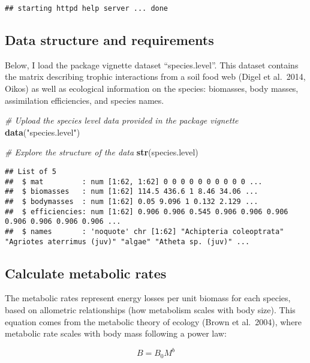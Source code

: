 \documentclass[
]{article}
\newenvironment{Shaded}{\begin{snugshade}}{\end{snugshade}}
\newcommand{\CommentTok}[1]{\textcolor[rgb]{0.56,0.35,0.01}{\textit{#1}}}
\newcommand{\FunctionTok}[1]{\textcolor[rgb]{0.13,0.29,0.53}{\textbf{#1}}}
\newcommand{\NormalTok}[1]{#1}
\newcommand{\StringTok}[1]{\textcolor[rgb]{0.31,0.60,0.02}{#1}}
\begin{document}
\begin{verbatim}
## starting httpd help server ... done
\end{verbatim}

\subsection{Data structure and
requirements}\label{data-structure-and-requirements}

Below, I load the package vignette dataset ``species.level''. This
dataset contains the matrix describing trophic interactions from a soil
food web (Digel et al.~2014, Oikos) as well as ecological information on
the species: biomasses, body masses, assimilation efficiencies, and
species names.

\begin{Shaded}
\begin{Highlighting}[]
\CommentTok{\# Upload the species level data provided in the package vignette}
\FunctionTok{data}\NormalTok{(}\StringTok{"species.level"}\NormalTok{)}

\CommentTok{\# Explore the structure of the data}
\FunctionTok{str}\NormalTok{(species.level)}
\end{Highlighting}
\end{Shaded}

\begin{verbatim}
## List of 5
##  $ mat         : num [1:62, 1:62] 0 0 0 0 0 0 0 0 0 0 ...
##  $ biomasses   : num [1:62] 114.5 436.6 1 8.46 34.06 ...
##  $ bodymasses  : num [1:62] 0.05 9.096 1 0.132 2.129 ...
##  $ efficiencies: num [1:62] 0.906 0.906 0.545 0.906 0.906 0.906 0.906 0.906 0.906 0.906 ...
##  $ names       : 'noquote' chr [1:62] "Achipteria coleoptrata" "Agriotes aterrimus (juv)" "algae" "Atheta sp. (juv)" ...
\end{verbatim}

\subsection{Calculate metabolic rates}\label{calculate-metabolic-rates}

The metabolic rates represent energy losses per unit biomass for each
species, based on allometric relationships (how metabolism scales with
body size). This equation comes from the metabolic theory of ecology
(Brown et al.~2004), where metabolic rate scales with body mass
following a power law:

\[
B = B_0 M^b
\]
\end{document}

